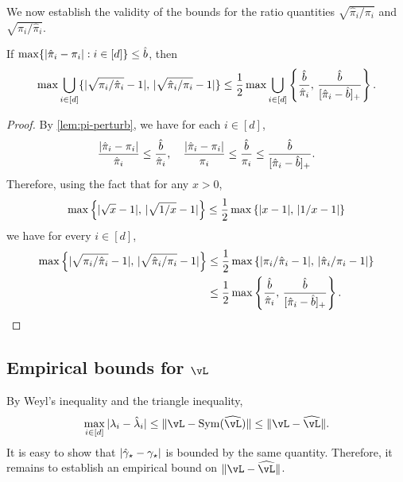 We now establish the validity of the bounds for the ratio quantities
$\sqrt{\hat\pi_i/\pi_i}$ and $\sqrt{\pi_i/\hat\pi_i}$.
\begin{lemma}
  \label{lem:pi-ratio-perturb}
  If $\max\{|\hat\pi_i-\pi_i| : i \in [d]\} \leq \hat{b}$,
  then
  \begin{equation}
    \max\bigcup_{i\in[d]}
    \{
      |\sqrt{\pi_i/\hat\pi_i}-1|,\,
      |\sqrt{\hat\pi_i/\pi_i}-1|
    \}
    \leq
    \frac12 \max \bigcup_{i\in[d]}
    \left\{
      \frac{\hat{b}}{\hat\pi_i},\,
      \frac{\hat{b}}{[\hat\pi_i-\hat{b}]_+}
    \right\}
    .
    \notag
  \end{equation}
\end{lemma}
\begin{proof}
  By \cref{lem:pi-perturb}, we have for each $i \in [d]$,
  \begin{equation}
    \frac{|\hat\pi_i - \pi_i|}{\hat\pi_i}
    \leq \frac{\hat{b}}{\hat\pi_i}
    , \quad
    \frac{|\hat\pi_i - \pi_i|}{\pi_i}
    \leq 
    \frac{\hat{b}}{\pi_i}
    \leq
    \frac{\hat{b}}{[\hat{\pi}_i-\hat{b}]_+}
    .
    \notag
  \end{equation}
  Therefore, using the fact that for any $x>0$,
  \[
    \max\left\{
      |\sqrt{x}-1| ,\, |\sqrt{1/x}-1|
    \right\} \leq \frac12 \max\left\{ |x-1| ,\, |1/x-1| \right\}
  \]
  we have for every $i \in [d]$,
  \begin{align*}
    \max\left\{
      |\sqrt{\pi_i/\hat\pi_i}-1|
      ,\,
      |\sqrt{\hat\pi_i/\pi_i}-1|
    \right\}
    & \leq
    \frac12 \max\left\{
      |\pi_i/\hat\pi_i-1|
      ,\,
      |\hat\pi_i/\pi_i-1|
    \right\}
    \\
    & \leq
    \frac12 \max\left\{
      \frac{\hat{b}}{\hat\pi_i}
      ,\,
      \frac{\hat{b}}{[\hat{\pi}_i-\hat{b}]_+}
    \right\}
    .
    \qedhere
  \end{align*}
\end{proof}


\subsection{Empirical bounds for $\vL$}

By Weyl's inequality and the triangle inequality,
\[
  \max_{i \in [d]} |\lambda_i - \hat\lambda_i|
  \leq \norm{\vL - \Sym(\wh\vL)}
  \leq \norm{\vL - \wh\vL} .
\]
It is easy to show that $|\hat\gamma_{\star} - \gamma_{\star}|$ is bounded by the same
quantity.
Therefore, it remains to establish an empirical bound on $\norm{\vL -
\wh\vL}$.

